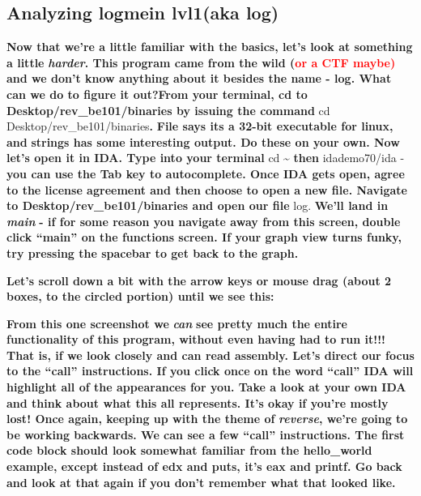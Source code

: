 \documentclass[letterpaper]{article}
\newcommand{\sitfig}[3]{
\begin{figure}[H]
\centering
\makebox[\textwidth][c]{
#2
}
\label{#1}
\end{figure}
}
\newcommand{\sitgfx}[4][scale=1.0]{
\sitfig{#3}{\texttt{[image: \#2]}}{#4}
}
\begin{document}
\subsection{Analyzing logmein lvl1(aka log)}

\textbf{Now that we're a little familiar with the basics, let's look at something a little
}\textbf{\textit{harder}}\textbf{. This program came from the wild (}\textbf{\textcolor{red}{or a CTF maybe)}}\textbf{
and we don't know anything about it besides the name - log. What can we do to figure it out?From your terminal, cd to
Desktop/rev\_be101/binaries by issuing the command }cd Desktop/rev\_be101/binaries\textbf{.
}\textbf{\textcolor[rgb]{0.21960784,0.4627451,0.11372549}{File }}\textbf{says its a 32-bit executable for linux, and
}\textbf{\textcolor[rgb]{0.21960784,0.4627451,0.11372549}{strings }}\textbf{has some interesting output. Do these on
your own. \newline
\newline
Now let's open it in IDA. Type into your terminal }cd \~{} \textbf{then }idademo70/ida -\textbf{you can use the Tab key
to autocomplete. Once IDA gets open, agree to the license agreement and then choose to open a new file. Navigate to
Desktop/rev\_be101/binaries and open our file }log. \textbf{We'll land in }\textbf{\textit{main }}\textbf{ {}- if for
some reason you navigate away from this screen, double click ``main'' on the functions screen. If your graph view turns
funky, try pressing the spacebar to get back to the graph.}  
\sitgfx[width=6.5in,height=3.2638in]{FINALWORKINGDOCFORMERLYPRECURSOR-img012.png}{fig:unk}{TODO CAPTION}
 

\textbf{Let's scroll down a bit with the arrow keys or mouse drag (about 2 boxes, to the circled portion) until we see
this:  }

  
\sitgfx[width=6.5in,height=3.4862in]{FINALWORKINGDOCFORMERLYPRECURSOR-img013.png}{fig:unk}{TODO CAPTION}
 

\textbf{From this one screenshot we }\textbf{\textit{can}}\textbf{ see pretty much the entire functionality of this
program, without even having had to run it!!! That is, if we look closely and can read assembly. Let's direct our focus
to the ``call'' instructions. If you click once on the word ``call'' IDA will highlight all of the appearances for you.
Take a look at your own IDA and think about what this all represents. It's okay if you're mostly lost! Once again,
keeping up with the theme of }\textbf{\textit{reverse}}\textbf{, we're going to be working backwards. \newline
\newline
We can see a few ``call'' instructions. The first code block should look somewhat familiar from the hello\_world
example, except instead of edx and puts, it's eax and printf. Go back and look at that again if you don't remember what
that looked like.}
\end{document}

